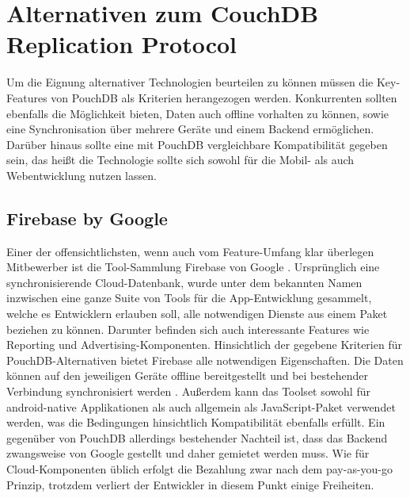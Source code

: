 \section{Alternativen zum CouchDB Replication Protocol}
Um die Eignung alternativer Technologien beurteilen zu können müssen die Key-Features von PouchDB als Kriterien herangezogen werden. Konkurrenten sollten ebenfalls die Möglichkeit bieten, Daten auch offline vorhalten zu können, sowie eine Synchronisation über mehrere Geräte und einem Backend ermöglichen. Darüber hinaus sollte eine mit PouchDB vergleichbare Kompatibilität gegeben sein, das heißt die Technologie sollte sich sowohl für die Mobil- als auch Webentwicklung nutzen lassen.

\subsection{Firebase by Google}
Einer der offensichtlichsten, wenn auch vom Feature-Umfang klar überlegen Mitbewerber ist die Tool-Sammlung Firebase von Google \cite{google:firebase}. Ursprünglich eine synchronisierende Cloud-Datenbank, wurde unter dem bekannten Namen inzwischen eine ganze Suite von Tools für die App-Entwicklung gesammelt, welche es Entwicklern erlauben soll, alle notwendigen Dienste aus einem Paket beziehen zu können. Darunter befinden sich auch interessante Features wie Reporting und Advertising-Komponenten. Hinsichtlich der gegebene Kriterien für PouchDB-Alternativen bietet Firebase alle notwendigen Eigenschaften. Die Daten können auf den jeweiligen Geräte offline bereitgestellt und bei bestehender Verbindung synchronisiert werden \cite{google:offlinejs}\cite{google:offlineandroid}. Außerdem kann das Toolset sowohl für android-native Applikationen als auch allgemein als JavaScript-Paket verwendet werden, was die Bedingungen hinsichtlich Kompatibilität ebenfalls erfüllt. Ein gegenüber von PouchDB allerdings bestehender Nachteil ist, dass das Backend zwangsweise von Google gestellt und daher gemietet werden muss. Wie für Cloud-Komponenten üblich erfolgt die Bezahlung zwar nach dem pay-as-you-go Prinzip, trotzdem verliert der Entwickler in diesem Punkt einige Freiheiten.

